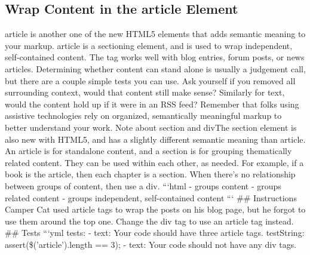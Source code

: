 \documentclass{article}%
\begin{document}
\subsection{Wrap Content in the article Element}%
\label{subsec:WrapContentinthearticleElement}%
article is another one of the new HTML5 elements that adds semantic meaning to your markup. article is a sectioning element, and is used to wrap independent, self{-}contained content. The tag works well with blog entries, forum posts, or news articles.\newline%
Determining whether content can stand alone is usually a judgement call, but there are a couple simple tests you can use. Ask yourself if you removed all surrounding context, would that content still make sense? Similarly for text, would the content hold up if it were in an RSS feed?\newline%
Remember that folks using assistive technologies rely on organized, semantically meaningful markup to better understand your work.\newline%
Note about section and divThe section element is also new with HTML5, and has a slightly different semantic meaning than article. An article is for standalone content, and a section is for grouping thematically related content. They can be used within each other, as needed. For example, if a book is the article, then each chapter is a section. When there's no relationship between groups of content, then use a div.\newline%
```html\newline%
 {-} groups content\newline%
 {-} groups related content\newline%
 {-} groups independent, self{-}contained content\newline%
```\newline%
\#\# Instructions\newline%
Camper Cat used article tags to wrap the posts on his blog page, but he forgot to use them around the top one. Change the div tag to use an article tag instead.\newline%
\#\# Tests\newline%
```yml\newline%
tests:\newline%
  {-} text: Your code should have three article tags.\newline%
    testString: assert(\$('article').length == 3);\newline%
  {-} text: Your code should not have any div tags.\newline%
\end{document}
